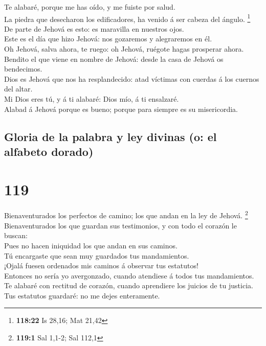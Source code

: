  Te alabaré, porque me has oído, y me fuiste por salud.\\
 La piedra que desecharon los edificadores, ha venido á ser
cabeza del ángulo. \footnote{\textbf{118:22} Is 28,16; Mat 21,42}\\
 De parte de Jehová es esto: es maravilla en nuestros
ojos.\\
 Este es el día que hizo Jehová: nos gozaremos y
alegraremos en él.\\
 Oh Jehová, salva ahora, te ruego: oh Jehová, ruégote hagas
prosperar ahora.\\
 Bendito el que viene en nombre de Jehová: desde la casa de
Jehová os bendecimos.\\
 Dios es Jehová que nos ha resplandecido: atad víctimas con
cuerdas á los cuernos del altar.\\
 Mi Dios eres tú, y á ti alabaré: Dios mío, á ti
ensalzaré.\\
 Alabad á Jehová porque es bueno; porque para siempre es su
misericordia.

\hypertarget{gloria-de-la-palabra-y-ley-divinas-o-el-alfabeto-dorado}{%
\subsection{Gloria de la palabra y ley divinas (o: el alfabeto
dorado)}\label{gloria-de-la-palabra-y-ley-divinas-o-el-alfabeto-dorado}}

\hypertarget{section-118}{%
\section{119}\label{section-118}}

 Bienaventurados los perfectos de camino; los que andan en
la ley de Jehová. \footnote{\textbf{119:1} Sal 1,1-2; Sal 112,1}\\
 Bienaventurados los que guardan sus testimonios, y con todo
el corazón le buscan:\\
 Pues no hacen iniquidad los que andan en sus caminos.\\
 Tú encargaste que sean muy guardados tus mandamientos.\\
 ¡Ojalá fuesen ordenados mis caminos á observar tus
estatutos!\\
 Entonces no sería yo avergonzado, cuando atendiese á todos
tus mandamientos.\\
 Te alabaré con rectitud de corazón, cuando aprendiere los
juicios de tu justicia.\\
 Tus estatutos guardaré: no me dejes enteramente.

